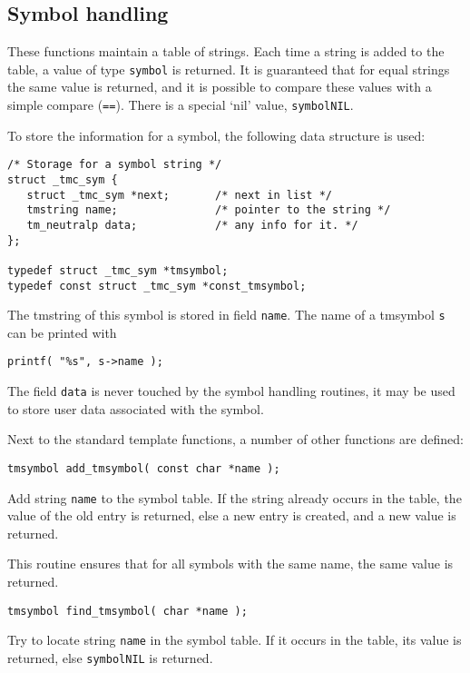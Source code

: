 \subsection{Symbol handling}
\label{s.tmsymbol}
These functions maintain a table of strings.
Each time a string is added to the table,
a value of type {\tt symbol} is returned.
It is guaranteed that for equal strings the same value is returned,
and it is possible to compare these values with a simple compare ({\tt ==}).
There is a special `nil' value, {\tt symbolNIL}.
\par
To store the information for a symbol, the following data structure is used:
\begin{verbatim}
/* Storage for a symbol string */
struct _tmc_sym {
   struct _tmc_sym *next;       /* next in list */
   tmstring name;               /* pointer to the string */
   tm_neutralp data;            /* any info for it. */
};

typedef struct _tmc_sym *tmsymbol;
typedef const struct _tmc_sym *const_tmsymbol;
\end{verbatim}
The tmstring of this symbol is stored in field \verb+name+.
The name of a tmsymbol \verb+s+ can be printed with
\begin{showfile}
\begin{verbatim}
printf( "%s", s->name );
\end{verbatim}
\end{showfile}
The field \verb+data+ is never touched by the symbol handling routines,
it may be used to store user data associated with the symbol.
\par
Next to the standard template functions, a number of other functions
are defined:
\begin{verbatim}
tmsymbol add_tmsymbol( const char *name );
\end{verbatim}
\begin{desc}
Add string {\tt name} to the symbol table.
If the string already occurs in the table, the value of the old
entry is returned, else a new entry is created,
and a new value is returned.
\par
This routine ensures that for all symbols with the same name,
the same value is returned.
\end{desc}
\begin{verbatim}
tmsymbol find_tmsymbol( char *name );
\end{verbatim}
\begin{desc}
Try to locate string {\tt name} in the symbol table.
If it occurs in the table, its value is returned,
else {\tt symbolNIL} is returned.
\end{desc}
